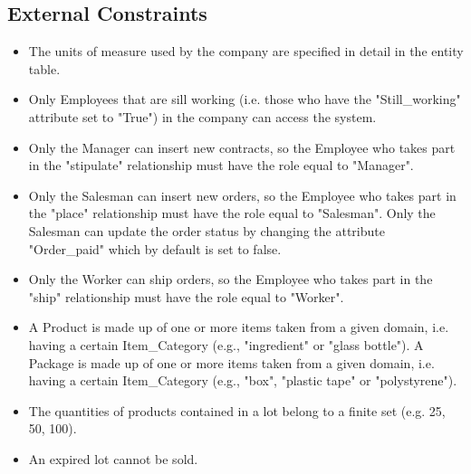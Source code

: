 \subsection{External Constraints}
\begin{itemize}
\item The units of measure used by the company are specified in detail in the entity table.
\item Only Employees that are sill working (i.e. those who have the "Still\_working" attribute set to "True") in the company can access the system.
\item Only the Manager can insert new contracts, so the Employee who takes part in the "stipulate" relationship must have the role equal to "Manager". 
\item Only the Salesman can insert new orders, so the Employee who takes part in the "place" relationship must have the role equal to "Salesman". Only the Salesman can update the order status by changing the attribute "Order\_paid" which by default is set to false.
\item Only the Worker can ship orders, so the Employee who takes part in the "ship" relationship must have the role equal to "Worker".
\item A Product is made up of one or more items taken from a given domain, i.e. having a certain Item\_Category (e.g., "ingredient" or "glass bottle"). A Package is made up of one or more items taken from a given domain, i.e. having a certain Item\_Category (e.g., "box", "plastic tape" or "polystyrene").
\item The quantities of products contained in a lot belong to a finite set (e.g. 25, 50, 100).
\item An expired lot cannot be sold.
\end{itemize}

